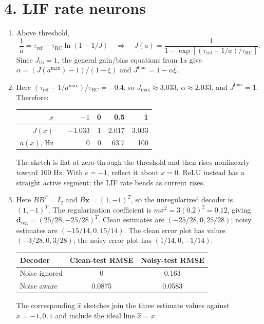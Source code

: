 \documentclass[10pt,letterpaper]{article}
\newcommand{\vct}[1]{\boldsymbol{#1}}
\begin{document}
\section*{4. LIF rate neurons}
\begin{enumerate}[label=\textbf{4\alph*.}]
\item Above threshold,
\[
\frac{1}{a}=\tau_{\mathrm{ref}}-\tau_{\mathrm{RC}}\ln(1-1/J)
\quad\Longrightarrow\quad
\boxed{J(a)=\frac{1}{1-\exp[(\tau_{\mathrm{ref}}-1/a)/\tau_{\mathrm{RC}}]}}.
\]
Since \(J_{\mathrm{th}}=1\), the general gain/bias equations from 1a give
\(\alpha=(J(a^{\max})-1)/(1-\xi)\) and \(J^{\mathrm{bias}}=1-\alpha\xi\).
\item Here \((\tau_{\mathrm{ref}}-1/a^{\max})/\tau_{\mathrm{RC}}=-0.4\), so \(J_{\max}\approx3.033\), \(\alpha\approx2.033\), and \(J^{\mathrm{bias}}=1\). Therefore:
\begin{center}\begin{tabular}{r r rrrr}\toprule \(x\) & & \(-1\) & 0 & 0.5 & 1\\\midrule
\(J(x)\) && \(-1.033\) & 1 & 2.017 & 3.033\\
\(a(x)\), Hz && 0 & 0 & 63.7 & 100\\\bottomrule\end{tabular}\end{center}
The sketch is flat at zero through the threshold and then rises nonlinearly toward 100 Hz. With \(e=-1\), reflect it about \(x=0\). ReLU instead has a straight active segment; the LIF rate bends as current rises.
\item Here \(BB^T=I_2\) and \(B\vct{x}=(1,-1)^T\), so the unregularized decoder is \((1,-1)^T\). The regularization coefficient is \(m\sigma^2=3(0.2)^2=0.12\), giving
\(\vct{d}_{\mathrm{reg}}=(25/28,-25/28)^T\). Clean estimates are \((-25/28,0,25/28)\); noisy estimates are \((-15/14,0,15/14)\). The clean error plot has values \((-3/28,0,3/28)\); the noisy error plot has \((1/14,0,-1/14)\).
\begin{center}\begin{tabular}{lcc}\toprule Decoder & Clean-test RMSE & Noisy-test RMSE\\\midrule
Noise ignored & 0 & 0.163\\
Noise aware & 0.0875 & 0.0583\\\bottomrule\end{tabular}\end{center}
The corresponding \(\hat{x}\) sketches join the three estimate values against \(x=-1,0,1\) and include the ideal line \(\hat{x}=x\).
\end{enumerate}
\end{document}
